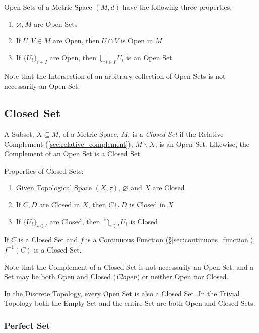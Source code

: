 Open Sets of a Metric Space $(M,d)$ have the following three
properties:
\begin{enumerate}
\item $\varnothing, M$ are Open Sets
\item If $U, V \in M$ are Open, then $U \cap V$ is Open in $M$
\item If $\{ U_i \}_{i \in I}$ are Open, then $\bigcup_{i \in I}
  U_i$ is an Open Set
\end{enumerate}
\HandRight\; Note that the Intersection of an arbitrary collection of
Open Sets is not necessarily an Open Set.



\subsection{Closed Set}\label{sec:closed_set}

A Subset, $X \subseteq M$, of a Metric Space, $M$, is a \emph{Closed
  Set} if the Relative Complement (\ref{sec:relative_complement}), $M
\backslash X$, is an Open Set. Likewise, the Complement of an Open Set
is a Closed Set.

Properties of Closed Sets:
\begin{enumerate}
  \item Given Topological Space $(X, \tau)$, $\varnothing$ and $X$ are
  Closed
  \item If $C, D$ are Closed in $X$, then $C \cup D$ is Closed in $X$
  \item If $\{ U_i \}_{i \in I}$ are Closed, then $\bigcap_{i \in I}
  U_i$ is Closed
\end{enumerate}

If $C$ is a Closed Set and $f$ is a Continuous Function
(\S\ref{sec:continuous_function}), $f^{-1}(C)$ is a Closed Set.

\HandRight\; Note that the Complement of a Closed Set is not
necessarily an Open Set, and a Set may be both Open and Closed
(\emph{Clopen}) or neither Open nor Closed.

In the Discrete Topology, every Open Set is also a Closed Set. In the
Trivial Topology both the Empty Set and the entire Set are both Open
and Closed Sets.



\subsubsection{Perfect Set}\label{sec:perfect_set}

